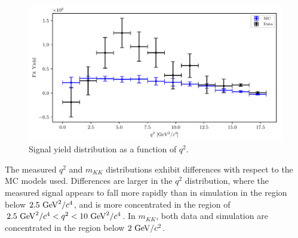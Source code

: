 \begin{figure}[H]
	\centering
	\captionsetup{width=0.8\linewidth}
	\includegraphics[width=\linewidth]{fig/sig_q2_all}
	\caption{Signal yield distribution as a function of $q^2$.}
	\label{fig:q2_windows}
\end{figure} 

The measured $q^2$ and $m_{KK}$ distributions exhibit differences with respect to the MC models used. Differences are larger in the $q^2$ distribution, where the measured signal appears to fall more rapidly than in simulation in the region below $2.5\mathrm{~GeV}^2/c^4$, and is more concentrated in the region of $2.5\mathrm{~GeV}^2/c^4 < q^2 < 10\mathrm{~GeV}^2/c^4$. In $m_{KK}$, both data and simulation are concentrated in the region below $2\mathrm{~GeV}/c^2$.